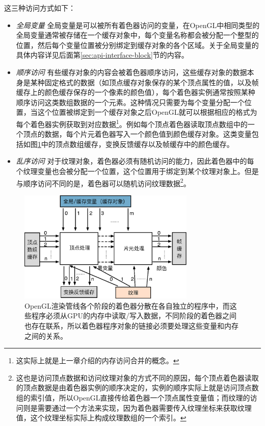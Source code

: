 这三种访问方式如下：
\begin{itemize}
	\item \emph{全局变量 }全局变量是可以被所有着色器访问的变量，在OpenGL中相同类型的全局变量通常被存储在一个缓存对象中，每个变量名称都会被分配一个整型的位置，然后每个变量位置被分别绑定到缓存对象的各个区域。关于全局变量的具体内容详见后面第\ref{sec:api-interface-block}节的内容。
	\item \emph{顺序访问 }有些缓存对象的内容会被着色器顺序访问，这些缓存对象的数据本身是某种固定格式的数据（如顶点缓存对象保存的某个顶点属性的值，以及帧缓存上的颜色缓存保存的一个像素的颜色值），每个着色器实例通常按照某种顺序访问这类数组数据的一个元素。这种情况只需要为每个变量分配一个位置，当这个位置被绑定到一个缓存对象之后OpenGL就可以根据相应的格式为每个着色器实例获取到对应数据\footnote{这实际上就是上一章介绍的内存访问合并的概念。}。例如每个顶点着色器读取顶点数组中的一个顶点的数据，每个片元着色器写入一个颜色值到颜色缓存对象。这类变量包括如图\ref{f:api-locations}中的顶点数组缓存，变换反馈缓存以及帧缓存中的颜色缓存。
	\item \emph{乱序访问 }对于纹理对象，着色器必须有随机访问的能力，因此着色器中的每个纹理变量也会被分配一个位置，这个位置用于绑定到某个纹理对象上。但是与顺序访问不同的是，着色器可以随机访问纹理数据\footnote{这也是访问顶点数据和访问纹理对象的方式不同的原因，每个顶点着色器读取的顶点数据是由着色器实例的顺序决定的，实例的顺序实际上就是访问顶点数组的索引值，所以OpenGL直接传给着色器一个顶点属性变量值；而纹理的访问则是需要通过一个方法来实现，因为着色器需要传入纹理坐标来获取纹理值，这个纹理坐标实际上构成纹理数组的一个索引。}。
\end{itemize}

\begin{figure}
\begin{center}
	\includegraphics[width=0.75\textwidth]{figures/api/locations}
\end{center}
	\caption{OpenGL渲染管线各个阶段的着色器分散在各自独立的程序中，而这些程序必须从GPU的内存中读取/写入数据，不同阶段的着色器之间也存在联系，所以着色器程序对象的链接必须要处理这些变量和内存之间的关系。}
	\label{f:api-locations}
\end{figure}

